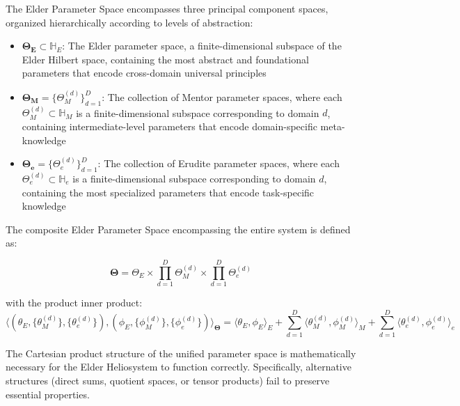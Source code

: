 \begin{definition}
\label{def:elder_parameter_space}
The Elder Parameter Space encompasses three principal component spaces, organized hierarchically according to levels of abstraction:

\begin{itemize}
    \item $\boldsymbol{\Theta_E} \subset \mathbb{H}_E$: The Elder parameter space, a finite-dimensional subspace of the Elder Hilbert space, containing the most abstract and foundational parameters that encode cross-domain universal principles
    
    \item $\boldsymbol{\Theta_M} = \{\Theta_M^{(d)}\}_{d=1}^D$: The collection of Mentor parameter spaces, where each $\Theta_M^{(d)} \subset \mathbb{H}_M$ is a finite-dimensional subspace corresponding to domain $d$, containing intermediate-level parameters that encode domain-specific meta-knowledge
    
    \item $\boldsymbol{\Theta_e} = \{\Theta_e^{(d)}\}_{d=1}^D$: The collection of Erudite parameter spaces, where each $\Theta_e^{(d)} \subset \mathbb{H}_e$ is a finite-dimensional subspace corresponding to domain $d$, containing the most specialized parameters that encode task-specific knowledge
\end{itemize}

The composite Elder Parameter Space encompassing the entire system is defined as:

\begin{equation}
\boldsymbol{\Theta} = \Theta_E \times \prod_{d=1}^D \Theta_M^{(d)} \times \prod_{d=1}^D \Theta_e^{(d)}
\end{equation}

with the product inner product:
\begin{equation}
\langle (\theta_E, \{\theta_M^{(d)}\}, \{\theta_e^{(d)}\}), (\phi_E, \{\phi_M^{(d)}\}, \{\phi_e^{(d)}\}) \rangle_{\boldsymbol{\Theta}} = \langle \theta_E, \phi_E \rangle_E + \sum_{d=1}^D \langle \theta_M^{(d)}, \phi_M^{(d)} \rangle_M + \sum_{d=1}^D \langle \theta_e^{(d)}, \phi_e^{(d)} \rangle_e
\end{equation}
\end{definition}



\begin{theorem}
\label{thm:cartesian_product_necessity}
The Cartesian product structure of the unified parameter space is mathematically necessary for the Elder Heliosystem to function correctly. Specifically, alternative structures (direct sums, quotient spaces, or tensor products) fail to preserve essential properties.
\end{theorem}

